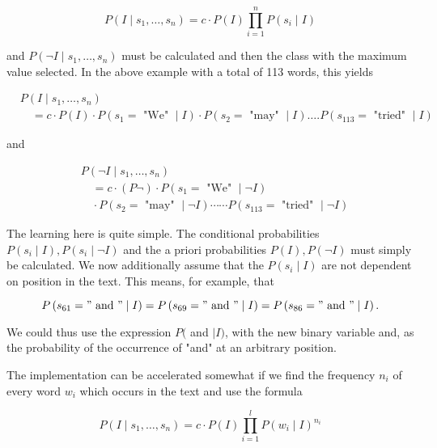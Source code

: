 \documentclass[10pt]{article}
\begin{document}
\begin{equation*}
P\left(I \mid s_{1}, \ldots, s_{n}\right)=c \cdot P(I) \prod_{i=1}^{n} P\left(s_{i} \mid I\right) \tag{8.9}
\end{equation*}


and $P\left(\neg I \mid s_{1}, \ldots, s_{n}\right)$ must be calculated and then the class with the maximum value selected. In the above example with a total of 113 words, this yields

$$
\begin{aligned}
& P\left(I \mid s_{1}, \ldots, s_{n}\right) \\
& \quad=c \cdot P(I) \cdot P\left(s_{1}=\text { "We" } \mid I\right) \cdot P\left(s_{2}=\text { "may" } \mid I\right) \ldots . P\left(s_{113}=\text { "tried" } \mid I\right)
\end{aligned}
$$

and

$$
\begin{aligned}
& P\left(\neg I \mid s_{1}, \ldots, s_{n}\right) \\
& \quad=c \cdot(P \neg) \cdot P\left(s_{1}=\text { "We" } \mid \neg I\right) \\
& \quad \cdot P\left(s_{2}=\text { "may" } \mid \neg I\right) \cdots \cdots P\left(s_{113}=\text { "tried" } \mid \neg I\right)
\end{aligned}
$$

The learning here is quite simple. The conditional probabilities $P\left(s_{i} \mid I\right), P\left(s_{i} \mid \neg I\right)$ and the a priori probabilities $P(I), P(\neg I)$ must simply be calculated. We now additionally assume that the $P\left(s_{i} \mid I\right)$ are not dependent on position in the text. This means, for example, that

$$
P\left(s_{61}=" \text { and } " \mid I\right)=P\left(s_{69}=" \text { and } " \mid I\right)=P\left(s_{86}=" \text { and } " \mid I\right) .
$$

We could thus use the expression $P($ and $\mid I)$, with the new binary variable and, as the probability of the occurrence of "and" at an arbitrary position.

The implementation can be accelerated somewhat if we find the frequency $n_{i}$ of every word $w_{i}$ which occurs in the text and use the formula


\begin{equation*}
P\left(I \mid s_{1}, \ldots, s_{n}\right)=c \cdot P(I) \prod_{i=1}^{l} P\left(w_{i} \mid I\right)^{n_{i}} \tag{8.10}
\end{equation*}
\end{document}

